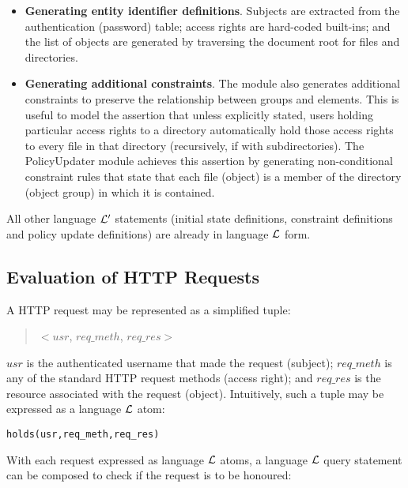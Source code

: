 \documentclass[11pt, twocolumn]{article}
\newenvironment{vverbatim}
  {\begin{alltt}}
  {\vspace{-\baselineskip}\end{alltt}}
\begin{document}
      \begin{itemize}
        \item
          {\bf Generating entity identifier definitions}. Subjects are
          extracted from the authentication (password) table; access rights
          are hard-coded built-ins; and the list of objects are generated by
          traversing the document root for files and directories.
        \item
          {\bf Generating additional constraints}. The module also generates
          additional constraints to preserve the relationship between groups
          and elements. This is useful to model the assertion that unless
          explicitly stated, users holding particular access rights to a
          directory automatically hold those access rights to every file in
          that directory (recursively, if with subdirectories). The
          PolicyUpdater module achieves this assertion by generating
          non-conditional constraint rules that state that each file
          (object) is a member of the directory (object group) in which it
          is contained.
      \end{itemize}

      All other language ${\cal L'}$ statements (initial state definitions,
      constraint definitions and policy update definitions) are already in
      language ${\cal L}$ form.

    \subsection{Evaluation of HTTP Requests}

      A HTTP request may be represented as a simplified tuple:

      \begin{quote}
        $<$$usr$, $req\_meth$, $req\_res$$>$
      \end{quote}

      $usr$ is the authenticated username that made the request (subject);
      $req\_meth$ is any of the standard HTTP request methods (access
      right); and $req\_res$ is the resource associated with the request
      (object). Intuitively, such a tuple may be expressed as a language
      ${\cal L}$ atom:

      \begin{vverbatim}
  holds(usr, req\_meth, req\_res)
      \end{vverbatim}

      With each request expressed as language ${\cal L}$ atoms, a language
      ${\cal L}$ query statement can be composed to check if the request is
      to be honoured:
\end{document}
